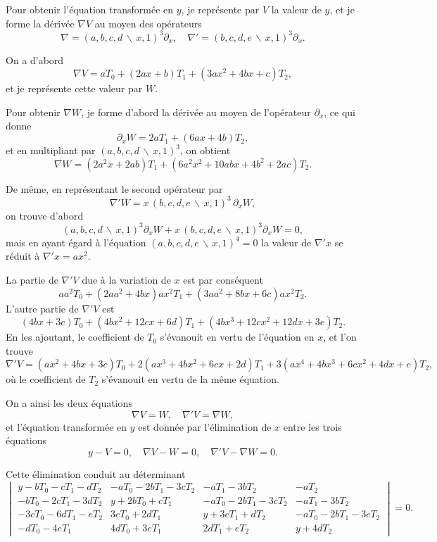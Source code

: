 \documentclass[11pt,a4paper]{article}
\theoremstyle{definition}
\begin{document}
Pour obtenir l'\'{e}quation transform\'{e}e en $y$, je repr\'{e}sente par $V$ la valeur de $y$,
et je forme la d\'{e}riv\'{e}e $\nabla V$ au moyen des op\'{e}rateurs
\[\nabla = (a,b,c,d\,\backslash\!\!\,x,1)^{3}\partial_{x},\quad
\nabla' = (b,c,d,e\,\backslash\!\!\,x,1)^{3}\partial_{x}.\]

On a d'abord
\[\nabla V = aT_{0} + (2ax+b)T_{1} + (3ax^{2}+4bx+c)T_{2},\]
et je repr\'{e}sente cette valeur par $W$.

Pour obtenir $\nabla W$, je forme d'abord la d\'{e}riv\'{e}e au moyen de l'op\'{e}rateur
$\partial_{x}$, ce qui donne
\[\partial_{x}W = 2aT_{1} + (6ax+4b)T_{2},\]
et en multipliant par $(a,b,c,d\,\backslash\!\!\,x,1)^{3}$, on obtient
\[\nabla W = (2a^{2}x+2ab)T_{1} + (6a^{2}x^{2}+10abx+4b^{2}+2ac)T_{2}.\]

De m\^{e}me, en repr\'{e}sentant le second op\'{e}rateur par
\[\nabla' W = x\,(b,c,d,e\,\backslash\!\!\,x,1)^{3}\,\partial_{x}W,\]
on trouve d'abord
\[(a,b,c,d\,\backslash\!\!\,x,1)^{3}\partial_{x}W + x\,(b,c,d,e\,\backslash\!\!\,x,1)^{3}\partial_{x}W = 0,\]
mais en ayant \'{e}gard \`{a} l'\'{e}quation $(a,b,c,d,e\,\backslash\!\!\,x,1)^{4}=0$ la valeur de
$\nabla' x$ se r\'{e}duit \`{a} $\nabla' x = ax^{2}$.

La partie de $\nabla' V$ due \`{a} la variation de $x$ est par cons\'{e}quent
\[aa^{2}T_{0} + (2aa^{2}+4bx)ax^{2}T_{1} + (3aa^{2}+8bx+6c)ax^{2}T_{2}.\]
L'autre partie de $\nabla' V$ est
\[(4bx+3c)T_{0} + (4bx^{2}+12cx+6d)T_{1} + (4bx^{3}+12cx^{2}+12dx+3e)T_{2}.\]
En les ajoutant, le coefficient de $T_{0}$ s'\'{e}vanouit en vertu de l'\'{e}quation en $x$,
et l'on trouve
\[\nabla' V = (ax^{2}+4bx+3c)T_{0} + 2(ax^{3}+4bx^{2}+6cx+2d)T_{1}
+ 3(ax^{4}+4bx^{3}+6cx^{2}+4dx+e)T_{2},\]
o\`{u} le coefficient de $T_{2}$ s'\'{e}vanouit en vertu de la m\^{e}me \'{e}quation.

On a ainsi les deux \'{e}quations
\[\nabla V = W, \quad \nabla' V = \nabla W,\]
et l'\'{e}quation transform\'{e}e en $y$ est donn\'{e}e par l'\'{e}limination de $x$ entre les
trois \'{e}quations
\[y - V = 0, \quad \nabla V - W = 0, \quad \nabla' V - \nabla W = 0.\]

Cette \'{e}limination conduit au d\'{e}terminant
\[
\begin{vmatrix}
y-bT_{0}-cT_{1}-dT_{2} & -aT_{0}-2bT_{1}-3cT_{2} & -aT_{1}-3bT_{2} & -aT_{2} \\
-bT_{0}-2cT_{1}-3dT_{2} & y+2bT_{0}+cT_{1} & -aT_{0}-2bT_{1}-3cT_{2} & -aT_{1}-3bT_{2} \\
-3cT_{0}-6dT_{1}-eT_{2} & 3cT_{0}+2dT_{1} & y+3cT_{1}+dT_{2} & -aT_{0}-2bT_{1}-3cT_{2} \\
-dT_{0}-4eT_{1} & 4dT_{0}+3eT_{1} & 2dT_{1}+eT_{2} & y+4dT_{2}
\end{vmatrix}
= 0.
\]
\end{document}
